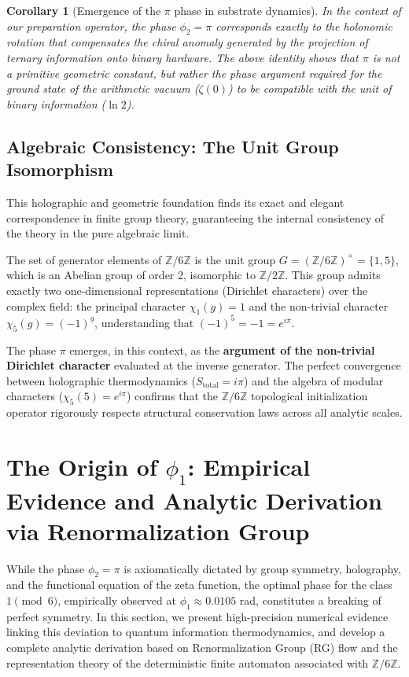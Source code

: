 \documentclass[12pt,a4paper]{article}
\theoremstyle{plain}
\newtheorem{corollary}[theorem]{Corollary}
\theoremstyle{definition}
\theoremstyle{remark}
\begin{document}
\begin{corollary}[Emergence of the $\pi$ phase in substrate dynamics]
In the context of our preparation operator, the phase $\phi_2 = \pi$ corresponds exactly to the holonomic rotation that compensates the chiral anomaly generated by the projection of ternary information onto binary hardware. The above identity shows that $\pi$ is not a primitive geometric constant, but rather the phase argument required for the ground state of the arithmetic vacuum ($\zeta(0)$) to be compatible with the unit of binary information ($\ln 2$).
\end{corollary}

\subsection{Algebraic Consistency: The Unit Group Isomorphism}
\label{subsec:isomorfismo_unidades}

This holographic and geometric foundation finds its exact and elegant correspondence in finite group theory, guaranteeing the internal consistency of the theory in the pure algebraic limit.

The set of generator elements of $\mathbb{Z}/6\mathbb{Z}$ is the unit group $G = (\mathbb{Z}/6\mathbb{Z})^{\times} = \{1,5\}$, which is an Abelian group of order 2, isomorphic to $\mathbb{Z}/2\mathbb{Z}$. This group admits exactly two one-dimensional representations (Dirichlet characters) over the complex field: the principal character $\chi_1(g) = 1$ and the non-trivial character $\chi_5(g) = (-1)^g$, understanding that $(-1)^5 = -1 = e^{i\pi}$.

The phase $\pi$ emerges, in this context, as the \textbf{argument of the non-trivial Dirichlet character} evaluated at the inverse generator. The perfect convergence between holographic thermodynamics ($S_{\text{total}} = i\pi$) and the algebra of modular characters ($\chi_5(5) = e^{i\pi}$) confirms that the $\mathbb{Z}/6\mathbb{Z}$ topological initialization operator rigorously respects structural conservation laws across all analytic scales.

\section{The Origin of $\phi_1$: Empirical Evidence and Analytic Derivation via Renormalization Group}
\label{sec:origen_phi1}

While the phase $\phi_2 = \pi$ is axiomatically dictated by group symmetry, holography, and the functional equation of the zeta function, the optimal phase for the class $1 \pmod 6$, empirically observed at $\phi_1 \approx 0.0105$ rad, constitutes a breaking of perfect symmetry. In this section, we present high-precision numerical evidence linking this deviation to quantum information thermodynamics, and develop a complete analytic derivation based on Renormalization Group (RG) flow and the representation theory of the deterministic finite automaton associated with $\mathbb{Z}/6\mathbb{Z}$.
\end{document}
